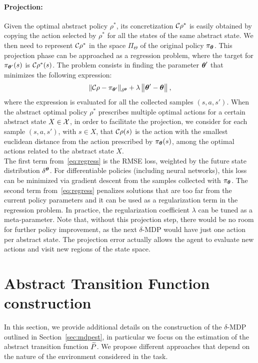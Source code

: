 \paragraph{Projection:}
Given the optimal abstract policy $\rho^*$, its concretization $\Conc\rho^*$ is easily obtained by copying the action selected by $\rho^{*}$ for all the states of the same abstract state. We then need to represent $\Conc\rho^{*}$ in the space $\Pi_{\Theta}$ of the original policy $\pi_{\vtheta}$. This projection phase can be approached as a regression problem, where the target for $\pi_{\vtheta'}(s)$ is $\Conc\rho^*(s)$. The problem consists in finding the parameter $\vtheta'$ that minimizes the following expression:
\begin{align}\label{eq:regress}
\norm[\delta^{\vtheta}]{\Conc\rho - \pi_{\vtheta'}} 
+ \lambda\norm{\vtheta'-\vtheta},
\end{align} 
where the expression is evaluated for all the collected samples $(s,a,s')$. 
When the abstract optimal policy $\rho^{*}$ prescribes multiple optimal actions for a certain abstract state $X \in \Xspace$, in order to facilitate the projection, we consider for each sample $(s,a,s')$, with $s \in X$, that $\Conc\rho(s)$ is the action with the smallest euclidean distance from the action prescribed by $\pi_{\vtheta}(s)$, among the optimal actions related to the abstract state $X$.\\
\newline
The first term from~\eqref{eq:regress} is the \acf{RMSE} loss, weighted by the future state distribution $\delta^{\vtheta}$. For differentiable policies (including neural networks), this loss can be minimized via gradient descent from the samples collected with $\pi_{\vtheta}$. The second term from~\eqref{eq:regress} penalizes solutions that are too far from the current policy parameters and it can be used as a regularization term in the regression problem. In practice, the regularization coefficient $\lambda$ can be tuned as a meta-parameter. Note that, without this projection step, there would be no room for further policy improvement, as the next $\delta$-\ac{MDP} would have just one action per abstract state. The projection error actually allows the agent to evaluate new actions and visit new regions of the state space. 

\section{Abstract Transition Function construction}\label{sec:absmdp}
In this section, we provide additional details on the construction of the $\delta$-MDP outlined in Section~\ref{sec:mdpest}, in particular we focus on the estimation of the abstract transition function $\wt{P}$. We propose different approaches that depend on the nature of the environment considered in the task.

